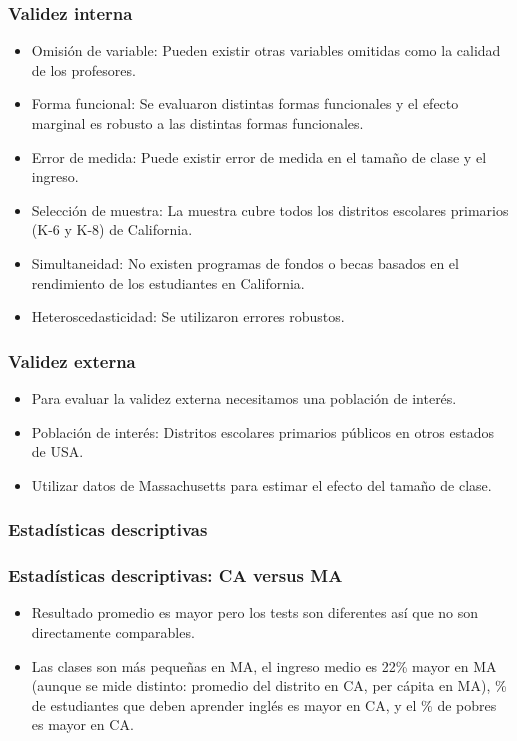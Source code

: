 \documentclass[t, compress, spanish, aspectratio=169]{beamer}
\begin{document}
\begin{frame}
    \frametitle{Validez interna}
    \begin{itemize}
        \item Omisi\'on de variable: Pueden existir otras variables omitidas como la calidad de los profesores.
        \item Forma funcional: Se evaluaron distintas formas funcionales y el efecto marginal es robusto a las distintas formas funcionales.
        \item Error de medida: Puede existir error de medida en el tama\~no de clase y el ingreso.
        \item Selecci\'on de muestra: La muestra cubre todos los distritos escolares primarios (K-6 y K-8) de California.
        \item Simultaneidad: No existen programas de fondos o becas basados en el rendimiento de los estudiantes en California.
        \item Heteroscedasticidad: Se utilizaron errores robustos.
    \end{itemize}
\end{frame}
\begin{frame}
    \frametitle{Validez externa}
    \begin{itemize}
        \item Para evaluar la validez externa necesitamos una poblaci\'on de inter\'es.
        \item Poblaci\'on de inter\'es: Distritos escolares primarios p\'ublicos en otros estados de USA.
        \item Utilizar datos de Massachusetts para estimar el efecto del tama\~no de clase.
    \end{itemize}
\end{frame}
\begin{frame}
    \frametitle{Estad\'isticas descriptivas}
    \begin{center}
    \small
    
    \end{center}
\end{frame}
\begin{frame}
    \frametitle{Estad\'isticas descriptivas: CA versus MA}
\begin{itemize}
    \item Resultado promedio es mayor pero los tests son diferentes as\'i que no son directamente comparables.
    \item Las clases son m\'as peque\~nas en MA, el ingreso medio es 22\% mayor en MA (aunque se mide distinto: promedio del distrito en CA, per c\'apita en MA), \% de estudiantes que deben aprender ingl\'es es mayor en CA, y el \% de pobres es mayor en CA.
\end{itemize}
\end{frame}
\end{document}
